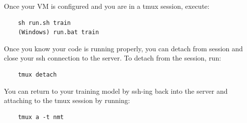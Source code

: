 Once your VM is configured and you are in a tmux session, execute:
\begin{lstlisting}
    sh run.sh train
    (Windows) run.bat train
\end{lstlisting}
    
Once you know your code is running properly, you can detach from session and close your ssh connection to the server. To detach from the session, run:
\begin{lstlisting}
    tmux detach
\end{lstlisting}
    
You can return to your training model by ssh-ing back into the server and attaching to the tmux session by running:
    
\begin{lstlisting}
    tmux a -t nmt
\end{lstlisting}

